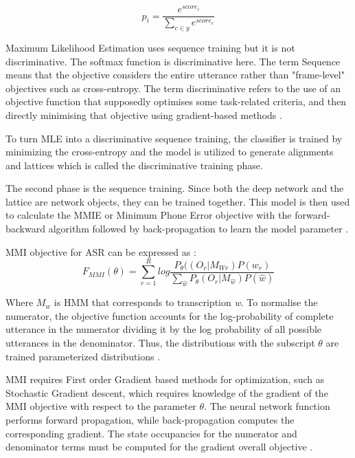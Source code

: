 \begin{equation}
 p_{i} = \frac{e^{score_{i}}}{\sum_{c \in y} e^{score_c}}
\end{equation}

Maximum Likelihood Estimation uses sequence training but it is not discriminative. The softmax function is discriminative here. The term Sequence means that the objective considers the entire utterance rather than "frame-level" objectives such as cross-entropy. The term discriminative refers to the use of an objective function that supposedly optimises some task-related criteria, and then directly minimising that objective using gradient-based methods \cite{noauthor_lattice_nodate}.

To turn MLE into a discriminative sequence training, the classifier is trained by minimizing the cross-entropy and the model is utilized to generate alignments and lattices which is called the discriminative training phase. 

The second phase is the sequence training. Since both the deep network and the lattice are network objects, they can be trained together. This model is then used to calculate the MMIE or Minimum Phone Error objective with the forward-backward algorithm followed by back-propagation to learn the model parameter \cite{wiesner_lattice_2020}.

MMI objective for ASR can be expressed as \cite{noauthor_lattice_nodate}:
\begin{equation}
    F_{MMI}(\theta) = \sum_{r=1}^{R} log \frac{P_{\theta}((O_{r}|M_{Wr})P(w_{r})}{\sum_{\hat{w}}P_{\theta}(O_{r}|M_{\hat{w}})P(\hat{w})} 
\end{equation}

Where $M_{w}$ is HMM that corresponds to transcription \textit{w}. To normalise the numerator, the objective function accounts for the log-probability of complete utterance in the numerator dividing it by the log probability of all possible utterances in the denominator. Thus, the distributions with the subscript $\theta$ are trained parameterized distributions \cite{wiesner_lattice_2020}.


MMI requires First order Gradient based methods for optimization, such as Stochastic Gradient descent, which requires knowledge of the gradient of the MMI objective with respect to the parameter $\theta$. The neural network function performs forward propagation, while back-propagation computes the corresponding gradient. The state occupancies for the numerator and denominator terms must be computed for the gradient overall objective \cite{daniel_povey_kaldi_nodate}.

